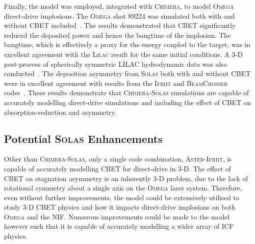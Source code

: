 Finally, the model was employed, integrated with \textsc{Chimera}, to model \textsc{Omega} direct-drive implosions.
The \textsc{Omega} shot 89224 was simulated both with and without \ac{CBET} included~\cite{cao_interpreting_2019}.
The results demonstrated that \ac{CBET} significantly reduced the deposited power and hence the bangtime of the implosion.
The bangtime, which is effectively a proxy for the energy coupled to the target, was in excellent agreement with the \textsc{Lilac} result for the same initial conditions.
A 3-D post-process of spherically symmetric LILAC hydrodynamic data was also conducted~\cite{colaitis_inverse_2021}.
The deposition asymmetry from \textsc{Solas} both with and without \ac{CBET} were in excellent agreement with results from the \textsc{Ifriit} and \textsc{BeamCrosser} codes~\cite{colaitis_3d_2023a}.
These results demonstrate that \textsc{Chimera}-\textsc{Solas} simulations are capable of accurately modelling direct-drive simulations and including the effect of \ac{CBET} on absorption-reduction and asymmetry.

\subsection{Potential \textsc{Solas} Enhancements}

Other than \textsc{Chimera}-\textsc{Solas}, only a single code combination, \textsc{Aster}-\textsc{Ifriit}, is capable of accurately modelling \ac{CBET} for direct-drive in 3-D.
The effect of \ac{CBET} on stagnation asymmetry is an inherently 3-D problem, due to the lack of rotational symmetry about a single axis on the \textsc{Omega} laser system.
Therefore, even without further improvements, the model could be extensively utilised to study 3-D \ac{CBET} physics and how it impacts direct-drive implosions on both \textsc{Omega} and the \ac{NIF}.
Numerous improvements could be made to the model however such that it is capable of accurately modelling a wider array of \ac{ICF} physics.

